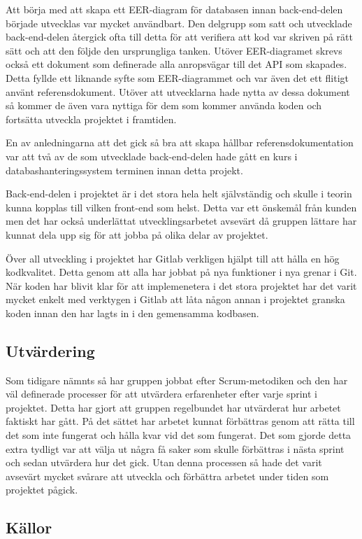 Att börja med att skapa ett EER-diagram för databasen innan back-end-delen började utvecklas var mycket användbart. Den delgrupp som satt och utvecklade back-end-delen återgick ofta till detta för att verifiera att kod var skriven på rätt sätt och att den följde den ursprungliga tanken. Utöver EER-diagramet skrevs också ett dokument som definerade alla anropsvägar till det API som skapades. Detta fyllde ett liknande syfte som EER-diagrammet och var även det ett flitigt använt referensdokument. Utöver att utvecklarna hade nytta av dessa dokument så kommer de även vara nyttiga för dem som kommer använda koden och fortsätta utveckla projektet i framtiden.

En av anledningarna att det gick så bra att skapa hållbar referensdokumentation var att två av de som utvecklade back-end-delen hade gått en kurs i databashanteringssystem terminen innan detta projekt.

Back-end-delen i projektet är i det stora hela helt självständig och skulle i teorin kunna kopplas till vilken front-end som helst. Detta var ett önskemål från kunden men det har också underlättat utvecklingsarbetet avsevärt då gruppen lättare har kunnat dela upp sig för att jobba på olika delar av projektet.

Över all utveckling i projektet har Gitlab verkligen hjälpt till att hålla en hög kodkvalitet. Detta genom att alla har jobbat på nya funktioner i nya grenar i Git. När koden har blivit klar för att implemenetera i det stora projektet har det varit mycket enkelt med verktygen i Gitlab att låta någon annan i projektet granska koden innan den har lagts in i den gemensamma kodbasen.

\subsection{Utvärdering}
Som tidigare nämnts så har gruppen jobbat efter Scrum-metodiken och den har väl definerade processer för att utvärdera erfarenheter efter varje sprint i projektet. Detta har gjort att gruppen regelbundet har utvärderat hur arbetet faktiskt har gått. På det sättet har arbetet kunnat förbättras genom att rätta till det som inte fungerat och hålla kvar vid det som fungerat. Det som gjorde detta extra tydligt var att välja ut några få saker som skulle förbättras i nästa sprint och sedan utvärdera hur det gick. Utan denna processen så hade det varit avsevärt mycket svårare att utveckla och förbättra arbetet under tiden som projektet pågick.

\subsection{Källor}


